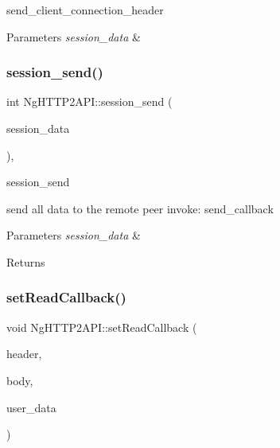send\+\_\+client\+\_\+connection\+\_\+header 


\begin{DoxyParams}{Parameters}
{\em session\+\_\+data} & \\
\hline
\end{DoxyParams}
\mbox{\label{classNetwork_1_1HTTP2_1_1NgHTTP2API_a98fcbd6599625a1fdaec14f49095bc7a}} 
\subsubsection{\texorpdfstring{session\+\_\+send()}{session\_send()}}
{\footnotesize\ttfamily int Ng\+H\+T\+T\+P2\+A\+P\+I\+::session\+\_\+send (\begin{DoxyParamCaption}\item[{\hyperlink{structNetwork_1_1HTTP2_1_1http2__session__data}{http2\+\_\+session\+\_\+data} $\ast$}]{session\+\_\+data }\end{DoxyParamCaption})\hspace{0.3cm}{\ttfamily [static]}, {\ttfamily [protected]}}



session\+\_\+send 

send all data to the remote peer invoke\+: send\+\_\+callback


\begin{DoxyParams}{Parameters}
{\em session\+\_\+data} & \\
\hline
\end{DoxyParams}
\begin{DoxyReturn}{Returns}

\end{DoxyReturn}
\mbox{\label{classNetwork_1_1HTTP2_1_1NgHTTP2API_a83048a73d75bda59e9f6b1c97039468e}} 
\subsubsection{\texorpdfstring{set\+Read\+Callback()}{setReadCallback()}}
{\footnotesize\ttfamily void Ng\+H\+T\+T\+P2\+A\+P\+I\+::set\+Read\+Callback (\begin{DoxyParamCaption}\item[{H\+T\+T\+P2\+Response\+Header\+Callback}]{header,  }\item[{H\+T\+T\+P2\+Response\+Body\+Callback}]{body,  }\item[{void $\ast$}]{user\+\_\+data }\end{DoxyParamCaption})}



